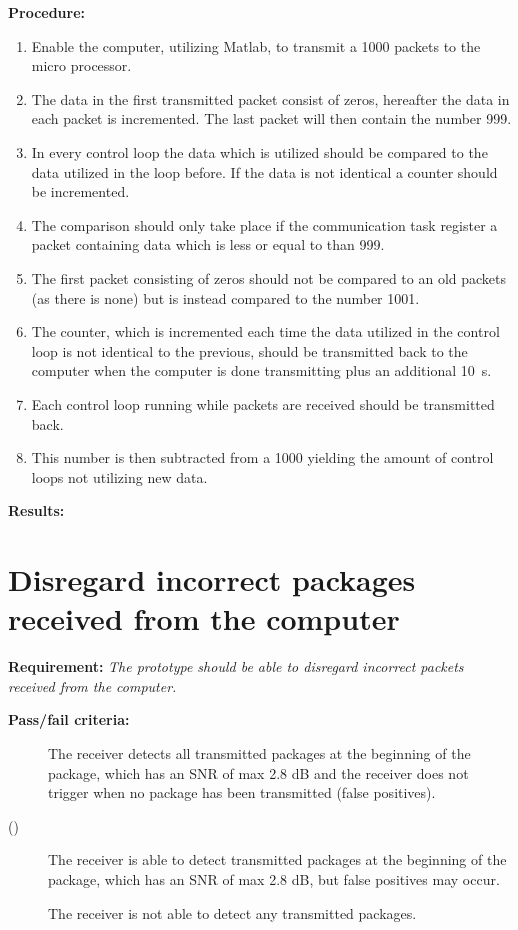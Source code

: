 		
\textbf{Procedure:}\\

\begin{enumerate}
	\item Enable the computer, utilizing Matlab, to transmit a 1000 packets to the micro processor.
	\item The data in the first transmitted packet consist of zeros, hereafter the data in each packet is incremented. The last packet will then contain the number 999. 
	\item In every control loop the data which is utilized should be compared to the data utilized in the loop before. If the data is not identical a counter should be incremented. 
	\item The comparison should only take place if the communication task register a packet containing data which is less or equal to than 999.
	\item The first packet consisting of zeros should not be compared to an old packets (as there is none) but is instead compared to the number 1001. 
	\item The counter, which is incremented each time the data utilized in the control loop is not identical to the previous, should be transmitted back to the computer when the computer is done transmitting plus an additional \SI{10}{s}.
	\item Each control loop running while packets are received should be transmitted back.
	\item This number is then subtracted from a 1000 yielding the amount of control loops not utilizing new data.
\end{enumerate} 

\textbf{Results:}

\newpage

\section{Disregard incorrect packages received from the computer}
\textbf{Requirement:}
\textit{The prototype should be able to disregard incorrect packets received from the computer.}

\textbf{Pass/fail criteria:}
	\begin{description}
	\item[  ] The receiver detects all transmitted packages at the beginning of the package, which has an SNR of max 2.8 dB and the receiver does not trigger when no package has been transmitted (false positives).
	\item[()]The receiver is able to detect transmitted packages at the beginning of the package, which has an SNR of max 2.8 dB, but false positives may occur.
	\item[  \phantom{)}]The receiver is not able to detect any transmitted packages.
	\end{description}
	
